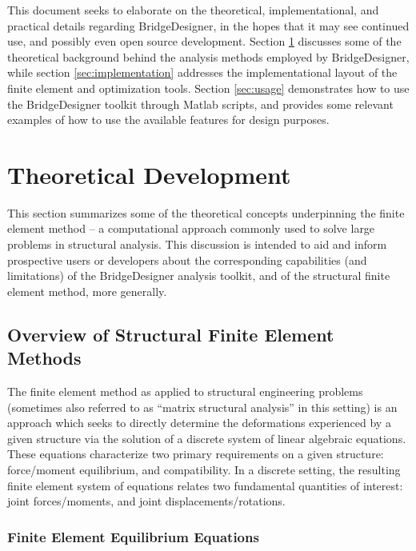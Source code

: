 \documentclass[12pt,a4paper,article]{memoir} %
\begin{document}
This document seeks to elaborate on the theoretical, implementational, and practical details regarding BridgeDesigner, in the hopes that it may see continued use, and possibly even open source development. Section \ref{sec:theory} discusses some of the theoretical background behind the analysis methods employed by BridgeDesigner, while section \ref{sec:implementation} addresses the implementational layout of the finite element and optimization tools. Section \ref{sec:usage} demonstrates how to use the BridgeDesigner toolkit through Matlab scripts, and provides some relevant examples of how to use the available features for design purposes.

\newpage

\chapter{Theoretical Development} \label{sec:theory}

This section summarizes some of the theoretical concepts underpinning the finite element method -- a computational approach commonly used to solve large problems in structural analysis. This discussion is intended to aid and inform prospective users or developers about the corresponding capabilities (and limitations) of the BridgeDesigner analysis toolkit, and of the structural finite element method, more generally.

\section{Overview of Structural Finite Element Methods}

The finite element method as applied to structural engineering problems (sometimes also referred to as ``matrix structural analysis'' in this setting) is an approach which seeks to directly determine the deformations experienced by a given structure via the solution of a discrete system of linear algebraic equations. These equations characterize two primary requirements on a given structure: force/moment equilibrium, and compatibility. In a discrete setting, the resulting finite element system of equations relates two fundamental quantities of interest: joint forces/moments, and joint displacements/rotations.

\subsection{Finite Element Equilibrium Equations}
\end{document}
